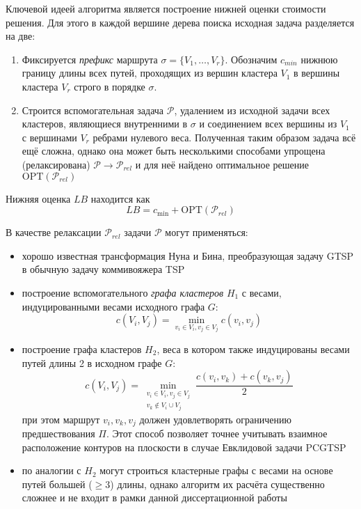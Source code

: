 Ключевой идеей алгоритма является построение нижней оценки стоимости решения.
Для этого в каждой вершине дерева поиска исходная задача разделяется на две:
\begin{enumerate}
    \item
    Фиксируется {\it префикс}
    маршрута $\sigma=\{V_1, \dots, V_r\}$.
    Обозначим $c_{min}$ нижнюю границу длины
    всех путей, проходящих из вершин кластера $V_1$
    в вершины кластера $V_r$ строго в порядке $\sigma$.
    \item
    Строится вспомогательная задача $\mathcal P$,
    удалением из исходной задачи всех кластеров,
    являющиеся внутренними в $\sigma$ и
    соединением всех вершины из $V_1$ с вершинами $V_r$
    ребрами нулевого веса.
    Полученная таким образом задача всё ещё сложна,
    однако она может быть несколькими способами
    упрощена (релаксирована) $\mathcal P \to \mathcal P_{rel}$
    и для неё найдено оптимальное решение $\mathrm{OPT}(\mathcal P_{rel})$
\end{enumerate}
Нижняя оценка $LB$
находится как
\begin{equation}
    \label{eq:pcgtsp-lb}
    LB = c_{\min} + \mathrm{OPT}(\mathcal P_{rel})
\end{equation}

В качестве релаксации $\mathcal P_{rel}$ задачи $\mathcal P$
могут применяться:
\begin{itemize}
    \item
    хорошо известная трансформация Нуна и Бина,
    преобразующая задачу GTSP в обычную задачу
    коммивояжера TSP
    \item
    построение вспомогательного {\it графа кластеров} $H_1$
    с весами, индуцированными весами исходного графа $G$:
    $$
    c(V_i, V_j) = \min_{v_i \in V_i, v_j \in V_j} c(v_i, v_j)
    $$
    \item
    построение графа кластеров $H_2$,
    веса в котором также индуцированы весами путей длины 2 в исходном графе $G$:
    $$
    c(V_i, V_j) =
        \min_{\substack{v_i \in V_i, v_j \in V_j\\v_k \notin V_i \cup V_j}  }
        \frac{c(v_i, v_k) + c(v_k, v_j)}{2}
    $$
    при этом маршрут $v_i, v_k, v_j$ должен удовлетворять ограничению предшествования $\Pi$.
    Этот способ позволяет точнее учитывать взаимное расположение контуров на плоскости
    в случае Евклидовой задачи PCGTSP
    \item
    по аналогии с $H_2$ могут строиться кластерные графы с весами на основе
    путей большей ($\geqslant 3$) длины,
    однако алгоритм их расчёта существенно сложнее и
    не входит в рамки данной диссертационной работы
\end{itemize}

